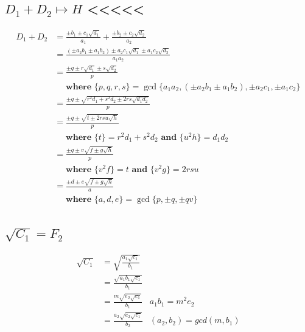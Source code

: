 \documentclass{article}
\begin{document}
\subsection{$D_1 + D_2 \mapsto H$ <<<<<}
\begin{align}
D_1 + D_2 &= \frac{\pm b_1 \pm c_1\sqrt{d_1}}{a_1} + \frac{\pm b_2 \pm c_2\sqrt{d_2}}{a_2}\\
 &= \frac{(\pm a_2b_1 \pm a_1b_2) \pm a_2c_1\sqrt{d_1} \pm a_1c_2\sqrt{d_2}}{a_1a_2}\\
 &= \frac{\pm q \pm r\sqrt{d_1} \pm s\sqrt{d_2}}{p} \\
 &\quad \textbf{ where } \{ p,q,r,s \} = \gcd \{ a_1a_2, (\pm a_2b_1 \pm a_1b_2), \pm a_2c_1, \pm a_1c_2 \} \nonumber \\
 &= \frac{\pm q \pm \sqrt{r^2d_1 + s^2d_2 \pm 2rs\sqrt{d_1d_2}}}{p} \\
 &= \frac{\pm q \pm \sqrt{t \pm 2rsu\sqrt{h}}}{p} \\
 &\quad \textbf{ where } \{ t \} = r^2d_1 + s^2d_2 \textbf{ and } \{ u^2h \} = d_1d_2 \nonumber \\
 &= \frac{\pm q \pm v\sqrt{f \pm g\sqrt{h}}}{p} \\
 &\quad \textbf{ where } \{ v^2f \} = t \textbf{ and } \{ v^2g \} = 2rsu \nonumber \\
 &= \frac{\pm d \pm e\sqrt{f \pm g\sqrt{h}}}{a} \\
 &\quad \textbf{ where } \{a,d,e\} = \gcd\{ p, \pm q, \pm qv \} \nonumber \\
\end{align}


\subsection{$\sqrt{C_1} = F_2$}
\begin{align*}
\sqrt{C_1} &= \sqrt{\frac{a_1\sqrt{c_1}}{b_1}}\\
 &= \frac{\sqrt{a_1b_1\sqrt{c_1}}}{b_1}     \\
 &= \frac{m\sqrt{e_2\sqrt{c_1}}}{b_1}       & a_1b_1 = m^2e_2\\
 &= \frac{a_2\sqrt{e_2\sqrt{c_1}}}{b_2}     & (a_2,b_2) = gcd(m,b_1)
\end{align*}
\end{document}
